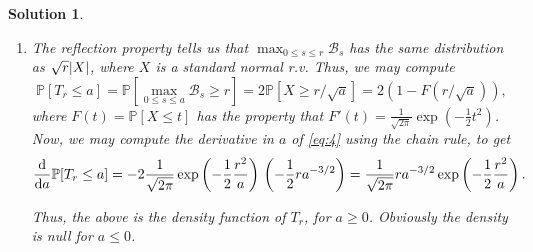 \documentclass{article}
\theoremstyle{nonumberplain}
\newtheorem{sol}{Solution}
\DeclarePairedDelimiter{\abs}{\lvert}{\rvert}
\newcommand{\PP}{\mathbb{P}}
\newcommand{\Brwn}{\mathcal{B}}
\begin{document}
\begin{sol}
\begin{enumerate}
\item The reflection property tells us that $\max_{0 \leq s \leq r} \Brwn_s$ has the same distribution as $\sqrt r \abs X$, where $X$ is a standard normal r.v. Thus, we may compute
\begin{equation}\label{eq:4}
\PP[T_r \leq a] = \PP[\max_{0 \leq s \leq a} \Brwn_s \geq r] = 2 \PP[X \geq r/\sqrt a] = 2 (1 - F(r/\sqrt a)),
\end{equation}
where $F(t) = \PP[X \leq t]$ has the property that $F'(t) = \frac1{\sqrt{2\pi}} \exp\left(-\frac12 t^2\right)$. Now, we may compute the derivative in $a$ of \eqref{eq:4} using the chain rule, to get
\begin{equation}
\diff*{\PP[T_r \leq a]}a = -2\frac1{\sqrt{2\pi}} \exp\left(-\frac12 \frac{r^2}a\right) \, \left(-\frac12 r a^{-3/2} \right) = \frac1{\sqrt{2\pi}} r a^{-3/2} \exp\left(-\frac12 \frac{r^2}a\right).
\end{equation}

Thus, the above is the density function of $T_r$, for $a \geq 0$. Obviously the density is null for $a \leq 0$.
\end{enumerate}
\end{sol}
\end{document}
